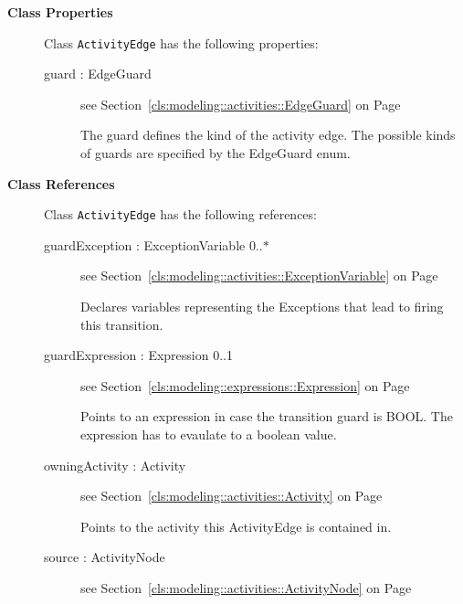 \begin{description}

	\item[\textbf{Class Properties}] Class \texttt{ActivityEdge} has the following properties:
	\begin{description}
\item[guard : EdgeGuard 	]
see Section~\ref{cls:modeling::activities::EdgeGuard} on Page~\pageref{cls:modeling::activities::EdgeGuard}
\hspace{\fill}
\nopagebreak


	
			
The guard defines the kind of the activity edge. The possible kinds of guards are specified by the EdgeGuard enum.	
		
	
	\end{description}
	
	\item[\textbf{Class References}] Class \texttt{ActivityEdge} has the following references:
	\begin{description}
\item[guardException : ExceptionVariable 			0..$*$]
see Section~\ref{cls:modeling::activities::ExceptionVariable} on Page~\pageref{cls:modeling::activities::ExceptionVariable}
\hspace{\fill}
\nopagebreak


	
			
Declares variables representing the Exceptions that lead to firing this transition.	
		
	
\item[guardExpression : Expression 			0..1]
see Section~\ref{cls:modeling::expressions::Expression} on Page~\pageref{cls:modeling::expressions::Expression}
\hspace{\fill}
\nopagebreak


	
			
Points to an expression in case the transition guard is BOOL. The expression has to evaulate to a boolean value.	
		
	
\item[owningActivity : Activity 	]
see Section~\ref{cls:modeling::activities::Activity} on Page~\pageref{cls:modeling::activities::Activity}
\hspace{\fill}
\nopagebreak


	
			
Points to the activity this ActivityEdge is contained in.	
		
	
\item[source : ActivityNode 	]
see Section~\ref{cls:modeling::activities::ActivityNode} on Page~\pageref{cls:modeling::activities::ActivityNode}
\hspace{\fill}
\nopagebreak



\end{description}
\end{description}
